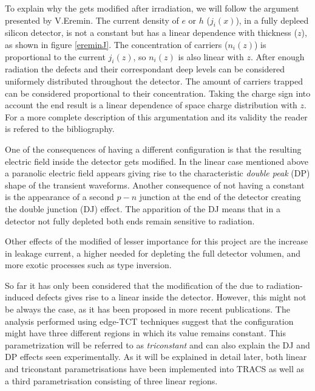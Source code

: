 To explain why the \neff gets modified after irradiation, we will follow the argument presented by V.Eremin\cite{Eremin}. The current density of $e$ or $h$ ($j_i(x)$), in a fully depleed silicon detector, is not a constant but has a linear dependence with thickness ($z$), as shown  in figure \ref{ereminJ}. The concentration of carriers ($n_i(z)$) is proportional to the current $j_i(z)$, so $n_i(z)$ is also linear with $z$. After enough radiation the defects and their correspondant deep levels can be considered uniformely distributed throughout the detector. The amount of carriers trapped can be considered proportional to their concentration. Taking the charge sign into account the end result is a linear dependence of space charge distribution with $z$. For a more complete description of this argumentation and its validity the reader is refered to the bibliography.


One of the consequences of having a different \neff configuration is that the resulting electric field inside the detector gets modified. In the linear case mentioned above a paranolic electric field appears giving rise to the characteristic \emph{double peak} (DP) shape of the transient waveforms. Another consequence of not having a constant \neff is the appearance of a second $p-n$ junction at the end of the detector creating the double junction (DJ) effect. The apparition of the DJ means that in a detector not fully depleted both ends remain sensitive to radiation.

Other effects of the modified \neff of lesser importance for this project are the increase in leakage current, a higher \vias needed for depleting the full detector volumen, and more exotic processes such as type inversion. %


So far it has only been considered that the modification of the \neff due to radiation-induced defects gives rise to a linear \neff inside the detector. However, this might not be always the case, as it has been proposed in more recent publications\cite{KramVertex}. The analysis performed using edge-TCT techniques suggest that the \neff configuration might have three different regions in which its value remains constant. This parametrization will be referred to as \emph{triconstant} and can also explain the DJ and DP effects seen experimentally. As it will be explained in detail later, both linear and triconstant parametrisations have been implemented into TRACS as well as a third parametrisation consisting of three linear regions.  

